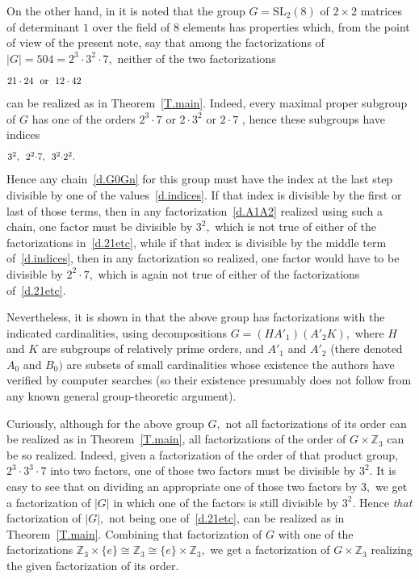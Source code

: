 \documentclass{amsart}
\numberwithin{equation}{section}
\numberwithin{theorem}{section}
\renewcommand{\r}{\mathrm}
\begin{document}
On the other hand, in \cite[p.685, middle paragraph]{BGV}
it is noted that the group $G = \r{SL}_2(8)$ of $2\times 2$
matrices of determinant $1$ over the field of $8$ elements has
properties which, from the point of view of the present note, say
that among the factorizations of $|G| = 504 = 2^3\cdot 3^2\cdot 7,$
neither of the two factorizations
%
\begin{equation}\begin{minipage}[c]{35pc}\label{d.21etc}
$21\cdot 24$ \ or \ $12\cdot 42$
\end{minipage}\end{equation}
%
can be realized as in Theorem~\ref{T.main}.
Indeed, every maximal proper subgroup of $G$ has one
of the orders $2^3\cdot 7$ or $2\cdot 3^2$ or $2\cdot 7$
\cite[p.2]{atlas}, hence these subgroups have indices
%
\begin{equation}\begin{minipage}[c]{35pc}\label{d.indices}
$3^2,$ \ $2^2{\cdot}7,$ \ $3^2{\cdot}2^2.$
\end{minipage}\end{equation}
%
Hence any chain~\eqref{d.G0Gn} for this group must have the index
at the last step divisible by one of the values~\eqref{d.indices}.
If that index is divisible by the first or last
of those terms, then in any factorization~\eqref{d.A1A2}
realized using such a chain, one factor must be
divisible by $3^2,$ which is not true of either of
the factorizations in~\eqref{d.21etc}, while if that index
is divisible by the middle term of~\eqref{d.indices}, then
in any factorization so realized,
one factor would have to be divisible by $2^2\cdot 7,$
which is again not true of either of the factorizations
of~\eqref{d.21etc}.

Nevertheless, it is shown in \cite{BGV} that the above group has
factorizations with the indicated cardinalities, using decompositions
$G = (H A'_1)(A'_2 K),$ where
$H$ and $K$ are subgroups of relatively prime orders,
and $A'_1$ and $A'_2$ (there denoted $A_0$ and $B_0)$
are subsets of small cardinalities whose existence the authors have
verified by computer searches (so their existence presumably does not
follow from any known general group-theoretic argument).

Curiously, although for the above group $G,$ not all factorizations
of its order can be realized as in Theorem~\ref{T.main},
all factorizations of the order of $G\times \mathbb{Z}_3$
can be so realized.
Indeed, given a factorization of the order of  that
product group, $2^3\cdot 3^3\cdot 7$
into two factors, one of those two factors must be divisible by $3^2.$
It is easy to see that on dividing an appropriate
one of those two factors by $3,$ we get a factorization of $|G|$
in which one of the factors is still divisible by $3^2.$
Hence {\em that} factorization of $|G|,$
not being one of~\eqref{d.21etc},
can be realized as in Theorem~\ref{T.main}.
Combining that factorization of $G$ with one of the factorizations
$\mathbb{Z}_3\times\{e\} \cong \mathbb{Z}_3 \cong
\{e\} \times \mathbb{Z}_3,$
we get a factorization of $G\times \mathbb{Z}_3$
realizing the given factorization of its order.
\end{document}
